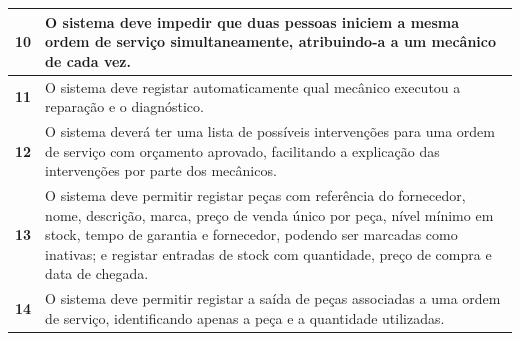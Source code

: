 \documentclass[11pt,a4paper]{article}
\begin{document}
\begin{tabularx}{\textwidth}{@{}|l|X|@{}}
		\textbf{10}  & O sistema deve impedir que duas pessoas iniciem a mesma ordem de serviço simultaneamente, atribuindo-a a um mecânico de cada vez. \\ \hline
		\textbf{11}  & O sistema deve registar automaticamente qual mecânico executou a reparação e o diagnóstico. \\ \hline
		\textbf{12}  & O sistema deverá ter uma lista de possíveis intervenções para uma ordem de serviço com orçamento aprovado, facilitando a explicação das intervenções por parte dos mecânicos. \\ \hline
		\textbf{13}  & O sistema deve permitir registar peças com referência do fornecedor, nome, descrição, marca, preço de venda único por peça, nível mínimo em stock, tempo de garantia e fornecedor, podendo ser marcadas como inativas; e registar entradas de stock com quantidade, preço de compra e data de chegada. \\ \hline
		\textbf{14}  & O sistema deve permitir registar a saída de peças associadas a uma ordem de serviço, identificando apenas a peça e a quantidade utilizadas. \\ \hline
	\end{tabularx}
\end{document}
